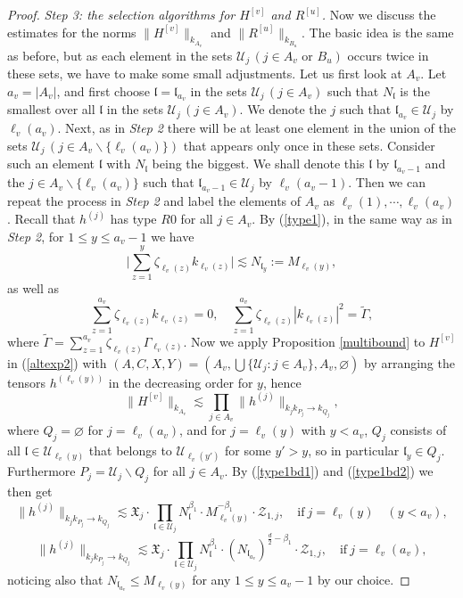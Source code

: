 \documentclass[11 pt,reqno]{amsart}
\theoremstyle{definition}
\theoremstyle{remark}
\numberwithin{equation}{section}
\newcommand{\Uc}{\mathcal{U}}
\newcommand{\Zc}{\mathcal{Z}}
\newcommand{\Xf}{\mathfrak{X}}
\newcommand{\lf}{\mathfrak{l}}
\begin{document}
{\begin{proof}
  \emph{Step 3: the selection algorithms for $H^{[v]}$ and $R^{[u]}$.} Now we discuss the estimates for the norms $\|H^{[v]}\|_{k_{A_v}}$ and $\|R^{[u]}\|_{k_{B_u}}$. The basic idea is the same as before, but as each element in the sets $\Uc_j\,(j\in A_v\textrm{ or }B_u)$ occurs twice in these sets, we have to make some small adjustments. Let us first look at $A_v$. Let $a_v=|A_v|$, and first choose $\lf=\lf_{a_v}$ in the sets $\Uc_j\,(j\in A_v)$ such that $N_\lf$ is the smallest over all $\lf$ in the sets $\Uc_j\,(j\in A_v)$. We denote the $j$ such that $\lf_{a_v}\in\Uc_j$ by $\ell_v(a_v)$. Next, as in \emph{Step 2} there will be at least one element in the union of the sets $\Uc_j\,(j\in A_v\backslash\{\ell_v(a_v)\})$ that appears only once in these sets. 
Consider such an element $\lf$ with $N_\lf$ being the biggest. We shall denote this $\lf$ by $\lf_{a_v-1}$ and  the $j\in A_v\backslash \{\ell_v(a_v)\}$ such that $\lf_{a_v-1}\in \Uc_j$ by $\ell_v (a_v-1)$.
  Then we can repeat the process in \emph{Step 2} and label the elements of $A_v$ as $\ell_v(1),\cdots ,\ell_v(a_v)$. Recall that $h^{(j)}$ has type $R0$ for all $j\in A_v$.
  By (\ref{type1}), in the same way as in \emph{Step 2}, for $1\leq y\leq a_v-1$ we have
  \begin{equation}\label{cancellation2}\bigg|\sum_{z=1}^y\zeta_{\ell_v(z)}k_{\ell_v(z)}\bigg|\lesssim N_{\lf_y}:=M_{\ell_v(y)},
  \end{equation} as well as 
  \begin{equation}\label{cancellation3}\sum_{z=1}^{a_v}\zeta_{\ell_v(z)}k_{\ell_v(z)}=0,\quad \sum_{z=1}^{a_v}\zeta_{\ell_v(z)}|k_{\ell_v(z)}|^2=\widetilde{\Gamma},
  \end{equation}
where $\widetilde{\Gamma} = \sum_{z=1}^{a_v}\zeta_{\ell_v(z)}\Gamma_{\ell_v(z)}$.
  Now we apply Proposition \ref{multibound} to $H^{[v]}$ in (\ref{altexp2}) with $(A, C, X, Y)=(A_v, \bigcup\{\Uc_j:j\in A_v\}, A_v, \varnothing)$ by arranging the tensors $h^{(\ell_v(y))}$ in the decreasing order for $y$, hence
  \begin{equation}\label{estproof2}\|H^{[v]}\|_{k_{A_v}}\lesssim\prod_{j\in A_v}\|h^{(j)}\|_{k_jk_{P_j}\to k_{Q_j}},
  \end{equation} where $Q_j=\varnothing$ for $j=\ell_v(a_v)$, and for $j=\ell_v(y)$ with $y<a_v$, $Q_j$ consists of all $\lf\in \Uc_{\ell_v(y)}$ that belongs to $\Uc_{\ell_v(y')}$ for some $y'>y$, so in particular $\lf_y\in Q_j$. Furthermore $P_j = \Uc_j\backslash Q_j$ for all $j\in A_v$. By (\ref{type1bd1}) and (\ref{type1bd2}) we then get
  \begin{equation}\label{actbd2}\|h^{(j)}\|_{k_jk_{P_j}\to k_{Q_j}}\lesssim \Xf_j\cdot\prod_{\lf\in \Uc_j}N_\lf^{\beta_1}\cdot M_{\ell_v(y)}^{-\beta_1}\cdot\Zc_{1,j},\quad \mathrm{if\ }j=\ell_v(y)\quad (y<a_v),
  \end{equation}
    \begin{equation}\label{actbd3} \|h^{(j)}\|_{k_jk_{P_j}\to k_{Q_j}}\lesssim \Xf_j\cdot\prod_{\lf\in \Uc_j}N_\lf^{\beta_1}\cdot (N_{\lf_{a_v}})^{\frac{d}{2}-\beta_1}\cdot\Zc_{1,j},\quad  \mathrm{if\ }j=\ell_v(a_v),
  \end{equation}noticing also that $N_{\lf_{a_v}}\leq M_{\ell_v(y)}$ for any $1\leq y\leq a_v-1$ by our choice.
  

\end{proof}}
\end{document}
